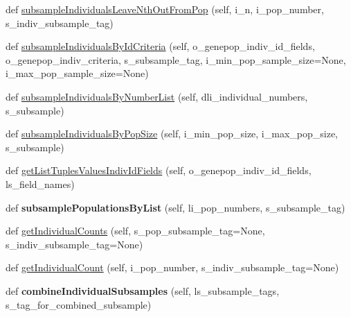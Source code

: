 \begin{DoxyCompactItemize}
\item 
def \hyperlink{classnegui_1_1genepopfilemanager_1_1GenepopFileManager_afb85a943b15c9a259510cc7f61b085b3}{subsample\+Individuals\+Leave\+Nth\+Out\+From\+Pop} (self, i\+\_\+n, i\+\_\+pop\+\_\+number, s\+\_\+indiv\+\_\+subsample\+\_\+tag)
\item 
def \hyperlink{classnegui_1_1genepopfilemanager_1_1GenepopFileManager_a361b30c9f9533b8610b3f587dc2677ea}{subsample\+Individuals\+By\+Id\+Criteria} (self, o\+\_\+genepop\+\_\+indiv\+\_\+id\+\_\+fields, o\+\_\+genepop\+\_\+indiv\+\_\+criteria, s\+\_\+subsample\+\_\+tag, i\+\_\+min\+\_\+pop\+\_\+sample\+\_\+size=None, i\+\_\+max\+\_\+pop\+\_\+sample\+\_\+size=None)
\item 
def \hyperlink{classnegui_1_1genepopfilemanager_1_1GenepopFileManager_abc486d49a3634caa7a64cd19cb6ff945}{subsample\+Individuals\+By\+Number\+List} (self, dli\+\_\+individual\+\_\+numbers, s\+\_\+subsample)
\item 
def \hyperlink{classnegui_1_1genepopfilemanager_1_1GenepopFileManager_afdad8528d7b19a8b2eeca447bb95a5a0}{subsample\+Individuals\+By\+Pop\+Size} (self, i\+\_\+min\+\_\+pop\+\_\+size, i\+\_\+max\+\_\+pop\+\_\+size, s\+\_\+subsample)
\item 
def \hyperlink{classnegui_1_1genepopfilemanager_1_1GenepopFileManager_a7e33739c660032e607db1066c4edd1f8}{get\+List\+Tuples\+Values\+Indiv\+Id\+Fields} (self, o\+\_\+genepop\+\_\+indiv\+\_\+id\+\_\+fields, ls\+\_\+field\+\_\+names)
\item 
def {\bfseries subsample\+Populations\+By\+List} (self, li\+\_\+pop\+\_\+numbers, s\+\_\+subsample\+\_\+tag)\hypertarget{classnegui_1_1genepopfilemanager_1_1GenepopFileManager_aab1109500d95ec010b4c39f198bb41c9}{}\label{classnegui_1_1genepopfilemanager_1_1GenepopFileManager_aab1109500d95ec010b4c39f198bb41c9}

\item 
def \hyperlink{classnegui_1_1genepopfilemanager_1_1GenepopFileManager_aca743749002b9828cd66730e42db4387}{get\+Individual\+Counts} (self, s\+\_\+pop\+\_\+subsample\+\_\+tag=None, s\+\_\+indiv\+\_\+subsample\+\_\+tag=None)
\item 
def \hyperlink{classnegui_1_1genepopfilemanager_1_1GenepopFileManager_a05e723069f5129b21a4d017c2a5317b0}{get\+Individual\+Count} (self, i\+\_\+pop\+\_\+number, s\+\_\+indiv\+\_\+subsample\+\_\+tag=None)
\item 
def {\bfseries combine\+Individual\+Subsamples} (self, ls\+\_\+subsample\+\_\+tags, s\+\_\+tag\+\_\+for\+\_\+combined\+\_\+subsample)\hypertarget{classnegui_1_1genepopfilemanager_1_1GenepopFileManager_a3f62c4250a0aa8a9b810424d0f62c068}{}\label{classnegui_1_1genepopfilemanager_1_1GenepopFileManager_a3f62c4250a0aa8a9b810424d0f62c068}


\end{DoxyCompactItemize}
